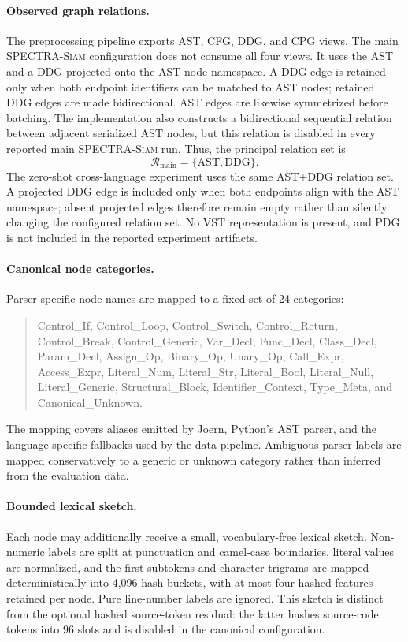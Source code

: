 \documentclass[authoryear,final,5p,times,twocolumn]{elsarticle}
\newcommand{\method}{\textsc{SPECTRA-Siam}}
\newcommand{\added}[1]{{\color{green!50!black}#1}}
\theoremstyle{plain}
\begin{document}
\paragraph{Observed graph relations.}
The preprocessing pipeline exports AST, CFG, DDG, and CPG views. The main
\method{} configuration does not consume all four views. It uses the AST and a
DDG projected onto the AST node namespace. \added{A DDG edge is retained only
when both endpoint identifiers can be matched to AST nodes; retained DDG edges
are made bidirectional. AST edges are likewise symmetrized before batching. The
implementation also constructs a bidirectional sequential relation between
adjacent serialized AST nodes, but this relation is disabled in every reported
main \method{} run.} Thus, the principal relation set is
\begin{equation}
\mathcal{R}_{\mathrm{main}}=\{\mathrm{AST},\mathrm{DDG}\}.
\label{eq:main_relations}
\end{equation}
\added{The zero-shot cross-language experiment uses the same AST+DDG relation
set. A projected DDG edge is included only when both endpoints align with the
AST namespace; absent projected edges therefore remain empty rather than
silently changing the configured relation set. No VST representation is
present, and PDG is not included in the reported experiment artifacts.}

\paragraph{Canonical node categories.}
Parser-specific node names are mapped to a fixed set of 24 categories:
\begin{quote}\small
Control\_If, Control\_Loop, Control\_Switch, Control\_Return,
Control\_Break, Control\_Generic, Var\_Decl, Func\_Decl,
Class\_Decl, Param\_Decl, Assign\_Op, Binary\_Op, Unary\_Op,
Call\_Expr, Access\_Expr, Literal\_Num, Literal\_Str,
Literal\_Bool, Literal\_Null, Literal\_Generic, Structural\_Block,
Identifier\_Context, Type\_Meta, and Canonical\_Unknown.
\end{quote}
\added{The mapping covers aliases emitted by Joern, Python's AST parser, and the
language-specific fallbacks used by the data pipeline. Ambiguous parser labels
are mapped conservatively to a generic or unknown category rather than inferred
from the evaluation data.}

\paragraph{Bounded lexical sketch.}
Each node may additionally receive a small, vocabulary-free lexical sketch.
\added{Non-numeric labels are split at punctuation and camel-case boundaries,
literal values are normalized, and the first subtokens and character trigrams
are mapped deterministically into 4,096 hash buckets, with at most four hashed
features retained per node. Pure line-number labels are ignored. This sketch is distinct from the optional hashed source-token
residual: the latter hashes source-code tokens into 96 slots and is disabled in
the canonical configuration.}
\end{document}
